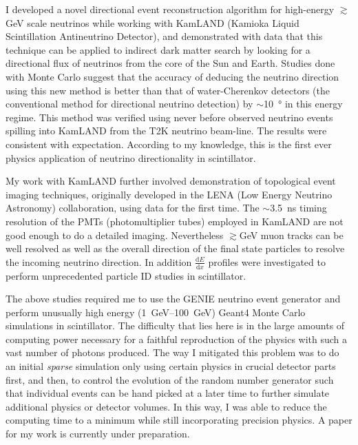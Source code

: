 \documentclass[10pt]{article} %
\begin{document}
I developed a novel directional event reconstruction algorithm for high-energy
$\gtrsim$\si{\giga\electronvolt} scale neutrinos while working with KamLAND
(Kamioka Liquid Scintillation Antineutrino Detector), and demonstrated with
data that this technique can be applied to indirect dark matter search by
looking for a directional flux of neutrinos from the core of the Sun and Earth.
Studies done with Monte Carlo suggest that the accuracy of deducing the
neutrino direction using this new method is better than that of water-Cherenkov
detectors (the conventional method for directional neutrino detection) by
$\sim$\SI{10}{\degree} in this energy regime. This method was verified using
never before observed neutrino events spilling into KamLAND from the T2K
neutrino beam-line. The results were consistent with expectation. According to
my knowledge, this is the first ever physics application of neutrino
directionality in scintillator.

My work with KamLAND further involved demonstration of topological event
imaging techniques, originally developed in the LENA (Low Energy Neutrino
Astronomy) collaboration, using data for the first time. The
$\sim$\SI{3.5}{\nano\second} timing resolution of the PMTs (photomultiplier
tubes) employed in KamLAND are not good enough to do a detailed imaging.
Nevertheless $\gtrsim$\si{\giga\electronvolt} muon tracks can be well resolved
as well as the overall direction of the final state particles to resolve the
incoming neutrino direction. In addition $\frac{\mathrm{d}E}{\mathrm{d}x}$
profiles were investigated to perform unprecedented particle ID studies in
scintillator.

The above studies required me to use the GENIE neutrino event generator and
perform unusually high energy (\SIrange{1}{100}{\giga\electronvolt}) Geant4
Monte Carlo simulations in scintillator. The difficulty that lies here is in
the large amounts of computing power necessary for a faithful reproduction of
the physics with such a vast number of photons produced. The way I mitigated
this problem was to do an initial \textit{sparse} simulation only using certain
physics in crucial detector parts first, and then, to control the evolution of
the random number generator such that individual events can be hand picked at a
later time to further simulate additional physics or detector volumes. In this
way, I was able to reduce the computing time to a minimum while still
incorporating precision physics. A paper for my work is currently under
preparation.
\end{document}
